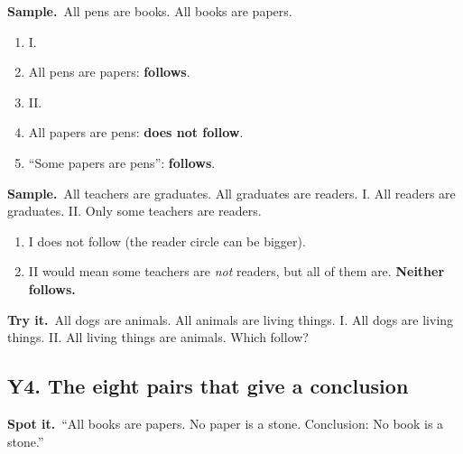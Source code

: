 \documentclass[11pt,a4paper]{article}
\let\oldsubsection\subsection
\renewcommand{\subsection}{\needspace{9\baselineskip}\oldsubsection}
\newcommand{\spot}{\textbf{\color{ember}Spot it.}\ }
\newif\ifkeepsamp
\newcommand{\samp}{\ifkeepsamp\needspace{4\baselineskip}\fi\textbf{\color{ember}Sample.}\ }
\newcommand{\tryit}[1]{\textbf{\color{ember}Try it.}\ #1}
\begin{document}
\samp All pens are books. All books are papers.
\begin{enumerate}
\item I.
\item All pens are papers: \textbf{follows}.
\item II.
\item All papers are pens: \textbf{does not follow}.
\item ``Some papers are pens'': \textbf{follows}.
\end{enumerate}
\samp All teachers are graduates. All graduates are readers. I. All readers are graduates. II. Only some teachers are readers.
\begin{enumerate}
\item I does not follow (the reader circle can be bigger).
\item II would mean some teachers are \emph{not} readers, but all of them are. \textbf{Neither follows.}
\end{enumerate}

\tryit All dogs are animals. All animals are living things. I. All dogs are living things. II. All living things are animals. Which follow?

\subsection{Y4. The eight pairs that give a conclusion}
\spot ``All books are papers. No paper is a stone. Conclusion: No book is a stone.''
\end{document}
